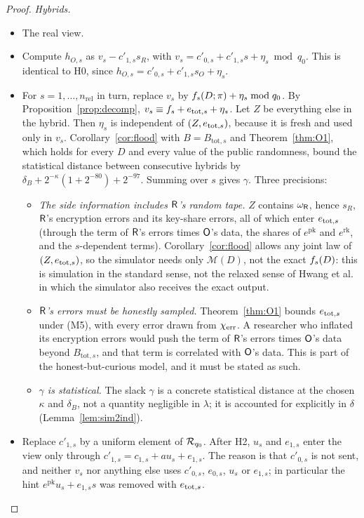 \begin{proof}
\emph{Hybrids.}
\begin{itemize}[nosep]
  \item[\textbf{H0}] The real view.
  \item[\textbf{H1}] Compute $h_{O,s}$ as $v_s-c'_{1,s}s_R$, with $v_s=c'_{0,s}+c'_{1,s}s+\eta_s\bmod q_0$. This is identical to H0, since $h_{O,s}=c'_{0,s}+c'_{1,s}s_O+\eta_s$.
  \item[\textbf{H2}$^{(s)}$] For $s=1,\dots,n_{\mathrm{rel}}$ in turn, replace $v_s$ by $f_s(D;\pi)+\eta_s\bmod q_0$. By Proposition~\ref{prop:decomp}, $v_s\equiv f_s+e_{\mathrm{tot},s}+\eta_s$. Let $Z$ be everything else in the hybrid. Then $\eta_s$ is independent of $(Z,e_{\mathrm{tot},s})$, because it is fresh and used only in $v_s$. Corollary~\ref{cor:flood} with $B=B_{\mathrm{tot},s}$ and Theorem~\ref{thm:O1}, which holds for every $D$ and every value of the public randomness, bound the statistical distance between consecutive hybrids by $\delta_B+2^{-\kappa}(1+2^{-80})+2^{-97}$. Summing over $s$ gives $\gamma$. Three precisions:
  \begin{itemize}[nosep]
    \item \emph{The side information includes $\mathsf{R}$'s random tape.} $Z$ contains $\omega_{\mathsf{R}}$, hence $s_R$, $\mathsf{R}$'s encryption errors and its key-share errors, all of which enter $e_{\mathrm{tot},s}$ (through the term of $\mathsf{R}$'s errors times $\mathsf{O}$'s data, the shares of $e^{\mathrm{pk}}$ and $e^{\mathrm{rk}}$, and the $s$-dependent terms). Corollary~\ref{cor:flood} allows any joint law of $(Z,e_{\mathrm{tot},s})$, so the simulator needs only $\mathcal M(D)$, not the exact $f_s(D)$: this is simulation in the standard sense, not the relaxed sense of Hwang et al.~\cite{HHKLS25} in which the simulator also receives the exact output.
    \item \emph{$\mathsf{R}$'s errors must be honestly sampled.} Theorem~\ref{thm:O1} bounds $e_{\mathrm{tot},s}$ under (M5), with every error drawn from $\chi_{\mathrm{err}}$. A researcher who inflated its encryption errors would push the term of $\mathsf{R}$'s errors times $\mathsf{O}$'s data beyond $B_{\mathrm{tot},s}$, and that term is correlated with $\mathsf{O}$'s data. This is part of the honest-but-curious model, and it must be stated as such.
    \item \emph{$\gamma$ is statistical.} The slack $\gamma$ is a concrete statistical distance at the chosen $\kappa$ and $\delta_B$, not a quantity negligible in $\lambda$; it is accounted for explicitly in $\delta$ (Lemma~\ref{lem:sim2ind}).
  \end{itemize}
  \item[\textbf{H3}$^{(s)}$] Replace $c'_{1,s}$ by a uniform element of $\mathcal{R}_{q_0}$. After H2, $u_s$ and $e_{1,s}$ enter the view only through $c'_{1,s}=c_{1,s}+au_s+e_{1,s}$. The reason is that $c'_{0,s}$ is not sent, and neither $v_s$ nor anything else uses $c'_{0,s}$, $e_{0,s}$, $u_s$ or $e_{1,s}$; in particular the hint $e^{\mathrm{pk}}u_s+e_{1,s}s$ was removed with $e_{\mathrm{tot},s}$.


\end{itemize}
\end{proof}
